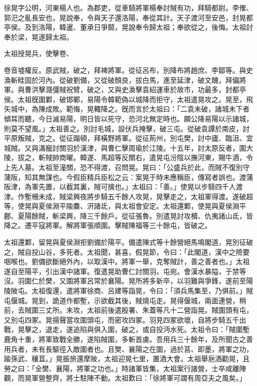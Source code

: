 
\begin{pinyinscope}
徐晃字公明，河東楊人也。為郡吏，從車騎將軍楊奉討賊有功，拜騎都尉。李傕、郭汜之亂長安也，晃說奉，令與天子還洛陽，奉從其計。天子渡河至安邑，封晃都亭侯。及到洛陽，韓暹、董承日爭鬬，晃說奉令歸太祖；奉欲從之，後悔。太祖討奉於梁，晃遂歸太祖。

太祖授晃兵，使擊卷、

卷音墟權反。原武賊，破之，拜裨將軍。從征呂布，別降布將趙庶、李鄒等。與史渙斬眭固於河內。從破劉備，又從破顏良，拔白馬，進至延津，破文醜，拜偏將軍。與曹洪擊㶏彊賊祝臂，破之，又與史渙擊袁紹運車於故市，功最多，封都亭侯。太祖旣圍鄴，破邯鄲，易陽令韓範偽以城降而拒守，太祖遣晃攻之。晃至，飛矢城中，為陳成敗。範悔，晃輙降之。旣而言於太祖曰：「二袁未破，諸城未下者傾耳而聽，今日滅易陽，明日皆以死守，恐河北無定時也。願公降易陽以示諸城，則莫不望風。」太祖善之。別討毛城，設伏兵掩擊，破三屯。從破袁譚於南皮，討平原叛賊，克之。從征蹋頓，拜橫野將軍。從征荊州，別屯樊，討中廬、臨沮、宜城賊。又與滿寵討關羽於漢津，與曹仁擊周瑜於江陵。十五年，討太原反者，圍大陵，拔之，斬賊帥商曜。韓遂、馬超等反關右，遣晃屯汾陰以撫河東，賜牛酒，令上先人墓。太祖至潼關，恐不得渡，召問晃。晃曰：「公盛兵於此，而賊不復別守蒲阪，知其無謀也。今假臣精兵臣松之云：案晃于時未應稱臣，傳寫者誤也。渡蒲阪津，為軍先置，以截其裏，賊可擒也。」太祖曰：「善。」使晃以步騎四千人渡津。作塹柵未成，賊梁興夜將步騎五千餘人攻晃，晃擊走之，太祖軍得渡。遂破超等，使晃與夏侯淵平隃麋、汧諸氐，與太祖會安定。太祖還鄴，使晃與夏侯淵平鄜、夏陽餘賊，斬梁興，降三千餘戶。從征張魯。別遣晃討攻櫝、仇夷諸山氐，皆降之。遷平寇將軍。解將軍張順圍。擊賊陳福等三十餘屯，皆破之。

太祖還鄴，留晃與夏侯淵拒劉備於陽平。備遣陳式等十餘營絕馬鳴閣道，晃別征破之，賊自投山谷，多死者。太祖聞，甚喜，假晃節，令曰：「此閣道，漢中之險要咽喉也。劉備欲斷絕外內，以取漢中。將軍一舉，克奪賊計，善之善者也。」太祖遂自至陽平，引出漢中諸軍。復遣晃助曹仁討關羽，屯宛。會漢水暴隘，于禁等沒。羽圍仁於樊，又圍將軍呂常於襄陽。晃所將多新卒，以羽難與爭鋒，遂前至陽陵陂屯。太祖復還，遣將軍徐商、呂建等詣晃，令曰：「須兵馬集至，乃俱前。」賊屯偃城。晃到，詭道作都塹，示欲截其後，賊燒屯走。晃得偃城，兩面連營，稍前，去賊圍三丈所。未攻，太祖前後遣殷署、朱蓋等凡十二營詣晃。賊圍頭有屯，又別屯四冢。晃揚聲當攻圍頭屯，而密攻四冢。羽見四冢欲壞，自將步騎五千出戰，晃擊之，退走，遂追陷與俱入圍，破之，或自投沔水死。太祖令曰：「賊圍塹鹿角十重，將軍致戰全勝，遂陷賊圍，多斬首虜。吾用兵三十餘年，及所聞古之善用兵者，未有長驅徑入敵圍者也。且樊、襄陽之在圍，過於莒、即墨，將軍之功，踰孫武、穰苴。」晃振旅還摩陂，太祖迎晃七里，置酒大會。太祖舉巵酒勸晃，且勞之曰：「全樊、襄陽，將軍之功也。」時諸軍皆集，太祖案行諸營，士卒咸離陣觀，而晃軍營整齊，將士駐陣不動。太祖歎曰：「徐將軍可謂有周亞夫之風矣。」


\end{pinyinscope}

